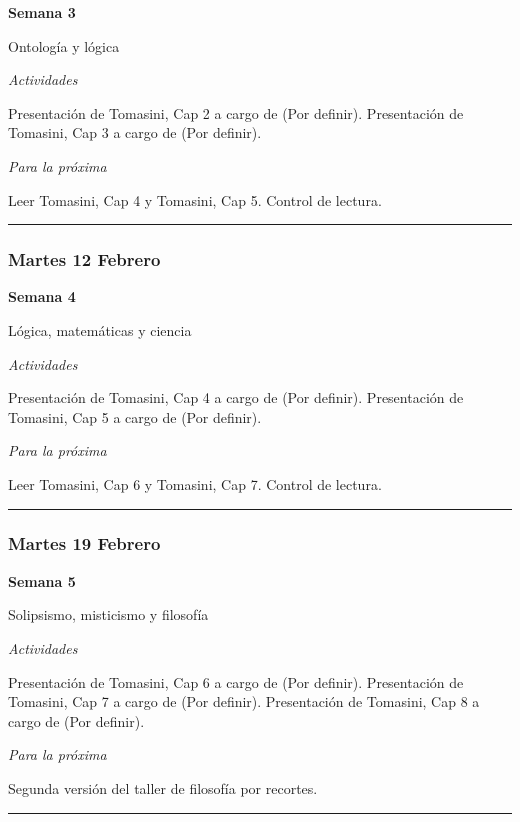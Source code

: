 \documentclass[spanish,]{article}
\begin{document}
\textbf{Semana 3}

Ontología y lógica

\emph{Actividades}

Presentación de Tomasini, Cap 2 a cargo de (Por definir). Presentación
de Tomasini, Cap 3 a cargo de (Por definir).

\emph{Para la próxima}

Leer Tomasini, Cap 4 y Tomasini, Cap 5. Control de lectura.

\begin{center}\rule{0.5\linewidth}{\linethickness}\end{center}

\subsubsection{Martes 12 Febrero}\label{martes-12-febrero}

\textbf{Semana 4}

Lógica, matemáticas y ciencia

\emph{Actividades}

Presentación de Tomasini, Cap 4 a cargo de (Por definir). Presentación
de Tomasini, Cap 5 a cargo de (Por definir).

\emph{Para la próxima}

Leer Tomasini, Cap 6 y Tomasini, Cap 7. Control de lectura.

\begin{center}\rule{0.5\linewidth}{\linethickness}\end{center}

\subsubsection{Martes 19 Febrero}\label{martes-19-febrero}

\textbf{Semana 5}

Solipsismo, misticismo y filosofía

\emph{Actividades}

Presentación de Tomasini, Cap 6 a cargo de (Por definir). Presentación
de Tomasini, Cap 7 a cargo de (Por definir). Presentación de Tomasini,
Cap 8 a cargo de (Por definir).

\emph{Para la próxima}

Segunda versión del taller de filosofía por recortes.

\begin{center}\rule{0.5\linewidth}{\linethickness}\end{center}
\end{document}
